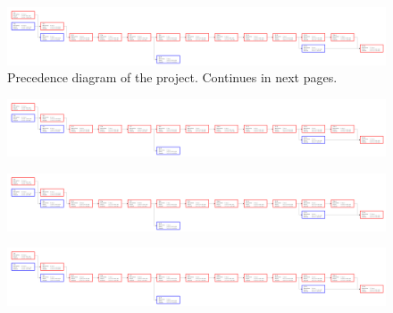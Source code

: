 \clearpage
\begin{figure}
	\centering
	\includegraphics[trim=0in 0in 26in 0in, clip, angle=90]{fig/precedence}
	\caption{Precedence diagram of the project. Continues in next pages.}\label{fig:precedence}
\end{figure}
\clearpage

\begin{figure}
	\centering
	\includegraphics[trim=8.88in 0in 17in 0in, clip, angle=90]{fig/precedence}
\end{figure}
\clearpage

\begin{figure}
	\centering
	\includegraphics[trim=17.88in 0in 8in 0in, clip, angle=90]{fig/precedence}
\end{figure}
\clearpage

\begin{figure}
	\centering
	\includegraphics[trim=26.88in 0in 0in 0in, clip, angle=90]{fig/precedence}
\end{figure}
\clearpage
